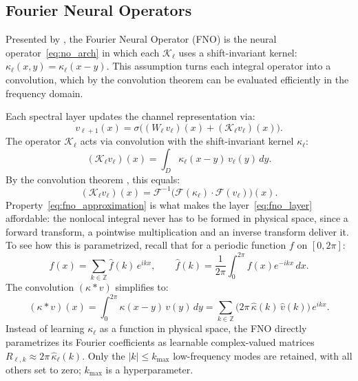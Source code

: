 \subsection{Fourier Neural Operators}
\label{subsec:fno}

Presented by \textcite{li2021}, the Fourier Neural Operator (FNO) is the neural operator~\eqref{eq:no_arch} in which each $\mathcal{K}_\ell$ uses a shift-invariant kernel: $\kappa_\ell(x, y) = \kappa_\ell(x - y)$. This assumption turns each integral operator into a convolution, which by the convolution theorem \parencite{debnath2012} can be evaluated efficiently in the frequency domain.

Each spectral layer updates the channel representation via:
\begin{equation}\label{eq:fno_layer}
    v_{\ell+1}(x) = \sigma \Big( (W_\ell\,v_\ell)(x) + (\mathcal{K}_\ell v_\ell)(x) \Big).
\end{equation}
The operator $\mathcal{K}_\ell$ acts via convolution with the shift-invariant kernel $\kappa_\ell$:
\begin{equation*}
    (\mathcal{K}_\ell v_\ell)(x) = \int_{D} \kappa_\ell(x-y)\,v_\ell(y)\,dy.
\end{equation*}
By the convolution theorem \parencite{debnath2012}, this equals:
\begin{equation}
    (\mathcal{K}_\ell v_\ell)(x) = \mathcal{F}^{-1} \Big( \mathcal{F}(\kappa_\ell) \cdot \mathcal{F}(v_\ell) \Big)(x).
    \label{eq:fno_approximation}
\end{equation}
Property~\eqref{eq:fno_approximation} is what makes the layer~\eqref{eq:fno_layer} affordable: the nonlocal integral never has to be formed in physical space, since a forward transform, a pointwise multiplication and an inverse transform deliver it. To see how this is parametrized, recall that for a periodic function $f$ on $[0, 2\pi]$:
\begin{equation*}
    f(x) = \sum_{k \in \mathbb{Z}} \hat{f}(k) \, e^{ikx}, \qquad \hat{f}(k) = \frac{1}{2\pi} \int_0^{2\pi} f(x) e^{-ikx} \,dx.
\end{equation*}
The convolution $(\kappa * v)$ simplifies to:
\begin{equation*}
    (\kappa * v)(x) = \int_0^{2\pi} \kappa(x-y)\, v(y)\, dy
    = \sum_{k \in \mathbb{Z}} \bigl(2\pi\, \hat{\kappa}(k)\, \hat{v}(k)\bigr)\, e^{ikx}.
\end{equation*}
Instead of learning $\kappa_\ell$ as a function in physical space, the FNO directly parametrizes its Fourier coefficients as learnable complex-valued matrices $R_{\ell,k} \approx 2\pi\,\hat{\kappa}_\ell(k)$. Only the $|k| \le k_{\max}$ low-frequency modes are retained, with all others set to zero; $k_{\max}$ is a hyperparameter.

